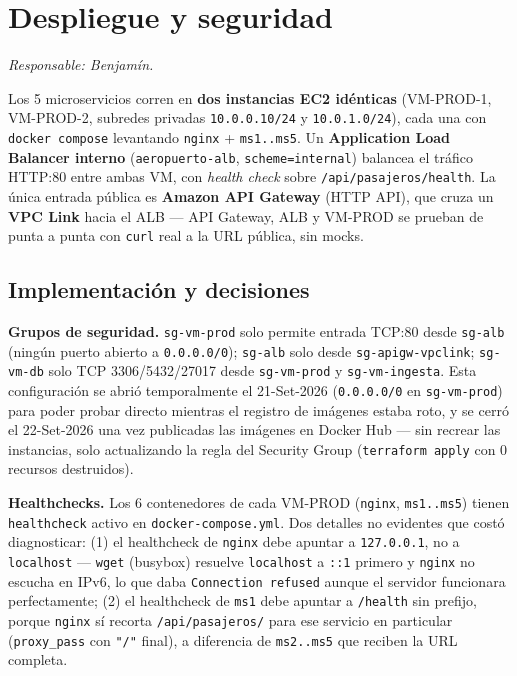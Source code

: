 \section{Despliegue y seguridad}
\textit{Responsable: Benjamín.}

Los 5 microservicios corren en \textbf{dos instancias EC2 idénticas} (VM-PROD-1, VM-PROD-2, subredes
privadas \texttt{10.0.0.10/24} y \texttt{10.0.1.0/24}), cada una con \texttt{docker compose} levantando
\texttt{nginx} + \texttt{ms1..ms5}. Un \textbf{Application Load Balancer interno} (\texttt{aeropuerto-alb},
\texttt{scheme=internal}) balancea el tráfico HTTP:80 entre ambas VM, con \textit{health check} sobre
\texttt{/api/pasajeros/health}. La única entrada pública es \textbf{Amazon API Gateway} (HTTP API), que
cruza un \textbf{VPC Link} hacia el ALB — API Gateway, ALB y VM-PROD se prueban de punta a punta con
\texttt{curl} real a la URL pública, sin mocks.

\subsection{Implementación y decisiones}

\textbf{Grupos de seguridad.} \texttt{sg-vm-prod} solo permite entrada TCP:80 desde \texttt{sg-alb}
(ningún puerto abierto a \texttt{0.0.0.0/0}); \texttt{sg-alb} solo desde \texttt{sg-apigw-vpclink};
\texttt{sg-vm-db} solo TCP 3306/5432/27017 desde \texttt{sg-vm-prod} y \texttt{sg-vm-ingesta}. Esta
configuración se abrió temporalmente el 21-Set-2026 (\texttt{0.0.0.0/0} en \texttt{sg-vm-prod}) para
poder probar directo mientras el registro de imágenes estaba roto, y se cerró el 22-Set-2026 una vez
publicadas las imágenes en Docker Hub — sin recrear las instancias, solo actualizando la regla del
Security Group (\texttt{terraform apply} con 0 recursos destruidos).

\textbf{Healthchecks.} Los 6 contenedores de cada VM-PROD (\texttt{nginx}, \texttt{ms1..ms5}) tienen
\texttt{healthcheck} activo en \texttt{docker-compose.yml}. Dos detalles no evidentes que costó
diagnosticar: (1) el healthcheck de \texttt{nginx} debe apuntar a \texttt{127.0.0.1}, no a
\texttt{localhost} — \texttt{wget} (busybox) resuelve \texttt{localhost} a \texttt{::1} primero y
\texttt{nginx} no escucha en IPv6, lo que daba \texttt{Connection refused} aunque el servidor
funcionara perfectamente; (2) el healthcheck de \texttt{ms1} debe apuntar a \texttt{/health} sin
prefijo, porque \texttt{nginx} sí recorta \texttt{/api/pasajeros/} para ese servicio en particular
(\texttt{proxy\_pass} con \texttt{"/"} final), a diferencia de \texttt{ms2..ms5} que reciben la URL
completa.

